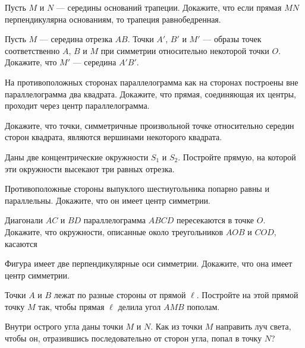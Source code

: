 \begin{tasks}
    \item Пусть $M$ и $N$  --- середины оснований трапеции. Докажите, что если прямая $MN$ перпендикулярна основаниям, то трапеция равнобедренная.
    \item Пусть $M$ --- середина отрезка $AB$. Точки $A'$, $B'$ и $M'$ --- образы точек соответственно $A$, $B$ и $M$ при симметрии относительно некоторой точки $O$. Докажите, что $M'$ --- середина $A'B'$.
    \item На противоположных сторонах параллелограмма как на сторонах построены вне параллелограмма два квадрата. Докажите, что прямая, соединяющая их центры, проходит через центр параллелограмма.
    \item Докажите, что точки, симметричные произвольной точке относительно середин сторон квадрата, являются вершинами некоторого квадрата.
    \item Даны две концентрические окружности $S_1$ и $S_2$. Постройте прямую, на которой эти окружности высекают три равных отрезка.
    \item Противоположные стороны выпуклого шестиугольника попарно равны и параллельны. Докажите, что он имеет центр симметрии.
    \item Диагонали $AC$ и $BD$ параллелограмма $ABCD$ пересекаются в точке $O$. Докажите, что окружности, описанные около треугольников $AOB$ и $COD$, касаются
    \item Фигура имеет две перпендикулярные оси симметрии. Докажите, что она имеет центр симметрии.
    \item Точки $A$ и $B$ лежат по разные стороны от прямой $\ell$. Постройте на этой прямой точку $M$ так, чтобы прямая $\ell$ делила угол $AMB$ пополам.
    \item Внутри острого угла даны точки $M$ и $N$. Как из точки $M$ направить луч света, чтобы он, отразившись последовательно от сторон угла, попал в точку $N$?

\end{tasks}
